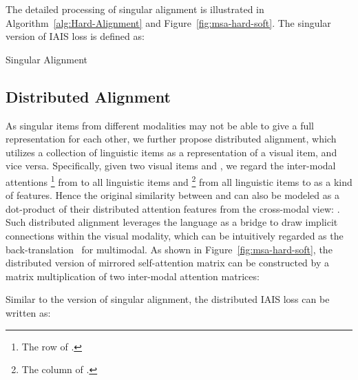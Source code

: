 \documentclass[11pt,a4paper]{article}
\begin{document}
The detailed processing of singular alignment is illustrated in Algorithm~\ref{alg:Hard-Alignment} and Figure~\ref{fig:msa-hard-soft}.
The singular version of IAIS loss is defined as:

\begin{algorithm}[t]
\small
\DontPrintSemicolon
{}
\For{ \KwTo }{
    \;
    \For{ \KwTo }{
        \;
        \;
    }
}
\For{ \KwTo }{
    \;
    \For{ \KwTo }{
        \;
        \;
    }
}
\; \Return 
\caption{Singular Alignment}
\label{alg:Hard-Alignment}
\end{algorithm}







 \subsection{Distributed Alignment}
As singular items from different modalities may not be able to give a full representation for each other, we further propose distributed alignment, which utilizes a collection of linguistic items as a representation of a visual item, and vice versa. 
Specifically, given two visual items  and , we regard the inter-modal attentions \footnote{The  row of .} from  to all linguistic items and \footnote{The  column of .} from all linguistic items to  as a kind of features. 
Hence the original similarity  between  and  can also be modeled as a dot-product of their distributed attention features from the cross-modal view: .
Such distributed alignment leverages the language as a bridge to draw implicit connections within the visual modality, which can be intuitively regarded as the back-translation~\cite{improving-MT} for multimodal. 
As shown in Figure~\ref{fig:msa-hard-soft}, the distributed version of mirrored self-attention matrix can be constructed by a matrix multiplication of two inter-modal attention matrices:

Similar to the version of singular alignment, the distributed IAIS loss can be written as: 
\end{document}

